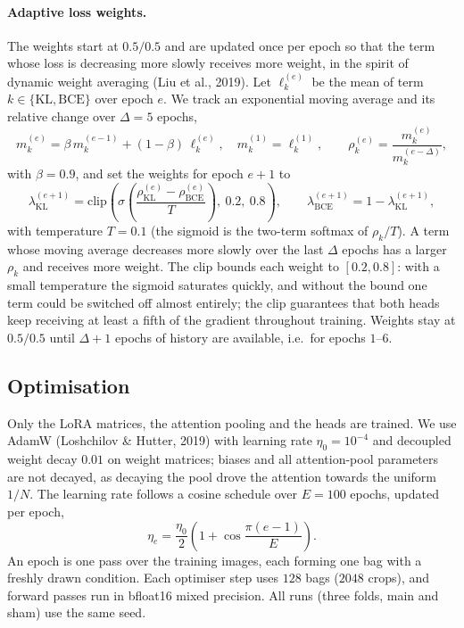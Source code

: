 \paragraph{Adaptive loss weights.}
The weights start at $0.5/0.5$ and are updated once per epoch so that the term
whose loss is decreasing more slowly receives more weight, in the spirit of
dynamic weight averaging (Liu et al., 2019). Let $\ell_k^{(e)}$ be the mean of
term $k \in \{\text{KL}, \text{BCE}\}$ over epoch $e$. We track an exponential
moving average and its relative change over $\Delta = 5$ epochs,
\begin{equation}
  m_k^{(e)} = \beta\, m_k^{(e-1)} + (1 - \beta)\, \ell_k^{(e)}, \quad m_k^{(1)} = \ell_k^{(1)}, \qquad
  \rho_k^{(e)} = \frac{m_k^{(e)}}{m_k^{(e-\Delta)}},
\end{equation}
with $\beta = 0.9$, and set the weights for epoch $e + 1$ to
\begin{equation}
  \lambda_\text{KL}^{(e+1)} = \mathrm{clip}\!\left( \sigma\!\left( \frac{\rho_\text{KL}^{(e)} - \rho_\text{BCE}^{(e)}}{T} \right),\ 0.2,\ 0.8 \right),
  \qquad \lambda_\text{BCE}^{(e+1)} = 1 - \lambda_\text{KL}^{(e+1)},
\end{equation}
with temperature $T = 0.1$ (the sigmoid is the two-term softmax of $\rho_k / T$).
A term whose moving average decreases more slowly over the last $\Delta$
epochs has a larger $\rho_k$ and receives more weight. The clip bounds each
weight to $[0.2, 0.8]$: with a small temperature the sigmoid saturates quickly,
and without the bound one term could be switched off almost entirely; the
clip guarantees that both heads keep receiving at least a fifth of the
gradient throughout training.
Weights stay at $0.5/0.5$ until $\Delta + 1$ epochs of history are available,
i.e.\ for epochs $1$--$6$.

\subsection{Optimisation}

Only the LoRA matrices, the attention pooling and the heads are trained. We use
AdamW (Loshchilov \& Hutter, 2019) with learning rate $\eta_0 = 10^{-4}$ and
decoupled weight decay $0.01$ on weight matrices; biases and all attention-pool
parameters are not decayed, as decaying the pool drove the attention towards
the uniform $1/N$. The learning rate follows a cosine schedule over
$E = 100$ epochs, updated per epoch,
\begin{equation}
  \eta_e = \frac{\eta_0}{2} \left( 1 + \cos \frac{\pi (e - 1)}{E} \right).
\end{equation}
An epoch is one pass over the training images, each forming one bag with a
freshly drawn condition. Each optimiser step uses $128$ bags ($2048$ crops), and
forward passes run in bfloat16 mixed precision. All runs (three folds, main and
sham) use the same seed.
